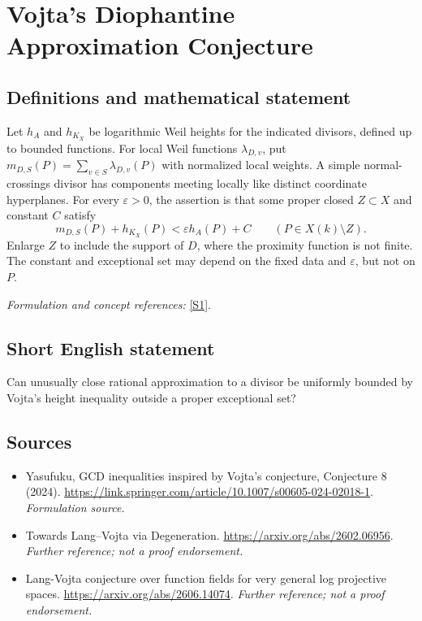 \documentclass[11pt]{article}
\begin{document}
\section*{\texorpdfstring{Vojta's Diophantine Approximation Conjecture}{Vojta's Diophantine Approximation Conjecture}}\label{30005098}
\subsection{Definitions and mathematical statement}
Let $h_A$ and $h_{K_X}$ be logarithmic Weil heights for the indicated divisors, defined up to bounded functions. For local Weil functions $\lambda_{D,v}$, put $m_{D,S}(P)=\sum_{v\in S}\lambda_{D,v}(P)$ with normalized local weights. A simple normal-crossings divisor has components meeting locally like distinct coordinate hyperplanes. For every $\varepsilon>0$, the assertion is that some proper closed $Z\subset X$ and constant $C$ satisfy
\[
 m_{D,S}(P)+h_{K_X}(P)<\varepsilon h_A(P)+C
 \qquad(P\in X(k)\setminus Z).
\]
Enlarge $Z$ to include the support of $D$, where the proximity function is not finite. The constant and exceptional set may depend on the fixed data and $\varepsilon$, but not on $P$.
\par\smallskip\textit{Formulation and concept references:} \href{https://link.springer.com/article/10.1007/s00605-024-02018-1}{[S1]}.

\subsection{Short English statement}
Can unusually close rational approximation to a divisor be uniformly bounded by Vojta's height inequality outside a proper exceptional set?
\subsection{Sources}
\begin{itemize}
\item[S1]Yasufuku, GCD inequalities inspired by Vojta's conjecture, Conjecture 8 (2024).
\url{https://link.springer.com/article/10.1007/s00605-024-02018-1}.
\textit{Formulation source.}
\item[S2]Towards Lang--Vojta via Degeneration.
\url{https://arxiv.org/abs/2602.06956}.
\textit{Further reference; not a proof endorsement.}
\item[S3]Lang-Vojta conjecture over function fields for very general log projective spaces.
\url{https://arxiv.org/abs/2606.14074}.
\textit{Further reference; not a proof endorsement.}
\end{itemize}
\end{document}
